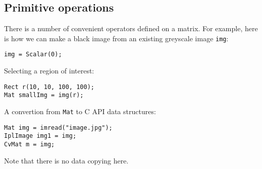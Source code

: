 \subsection{Primitive operations}
There is a number of convenient operators defined on a matrix. For example, here is how we can make a black image from an existing greyscale image \texttt{img}:
\begin{lstlisting}
img = Scalar(0);
\end{lstlisting}
Selecting a region of interest:
\begin{lstlisting}
Rect r(10, 10, 100, 100);
Mat smallImg = img(r);
\end{lstlisting}
A convertion from \texttt{Mat} to C API data structures:
\begin{lstlisting}
Mat img = imread("image.jpg");
IplImage img1 = img;
CvMat m = img;
\end{lstlisting}
Note that there is no data copying here. 
\fi


